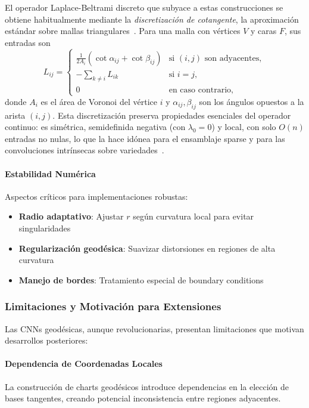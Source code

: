 El operador Laplace-Beltrami discreto que subyace a estas construcciones se obtiene habitualmente mediante la \emph{discretización de cotangente}, la aproximación estándar sobre mallas triangulares~\citep{bronstein2017geometricdeeplearning}. Para una malla con vértices $V$ y caras $F$, sus entradas son
\begin{equation}
L_{ij} = \begin{cases}
\tfrac{1}{2A_i}(\cot \alpha_{ij} + \cot \beta_{ij}) & \text{si } (i,j) \text{ son adyacentes},\\
-\sum_{k \neq i} L_{ik} & \text{si } i = j,\\
0 & \text{en caso contrario},
\end{cases}
\end{equation}
donde $A_i$ es el área de Voronoi del vértice $i$ y $\alpha_{ij}, \beta_{ij}$ son los ángulos opuestos a la arista $(i,j)$. Esta discretización preserva propiedades esenciales del operador continuo: es simétrica, semidefinida negativa (con $\lambda_0 = 0$) y local, con solo $O(n)$ entradas no nulas, lo que la hace idónea para el ensamblaje sparse y para las convoluciones intrínsecas sobre variedades~\citep{masci2018geodesicconvolutionalneural}.

\paragraph{Estabilidad Numérica}

Aspectos críticos para implementaciones robustas:
\begin{itemize}
    \item \textbf{Radio adaptativo}: Ajustar $r$ según curvatura local para evitar singularidades
    \item \textbf{Regularización geodésica}: Suavizar distorsiones en regiones de alta curvatura
    \item \textbf{Manejo de bordes}: Tratamiento especial de boundary conditions
\end{itemize}

\subsubsection{Limitaciones y Motivación para Extensiones}

Las CNNs geodésicas, aunque revolucionarias, presentan limitaciones que motivan desarrollos posteriores:

\paragraph{Dependencia de Coordenadas Locales}
La construcción de charts geodésicos introduce dependencias en la elección de bases tangentes, creando potencial inconsistencia entre regiones adyacentes.

